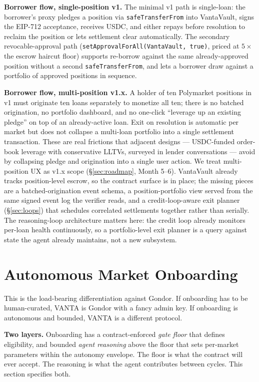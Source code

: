 \documentclass[11pt,letterpaper]{article}
\begin{document}
\textbf{Borrower flow, single-position v1.} The minimal v1 path is single-loan: the borrower's proxy pledges a position via \texttt{safeTransferFrom} into VantaVault, signs the EIP-712 acceptance, receives USDC, and either repays before resolution to reclaim the position or lets settlement clear automatically. The secondary revocable-approval path (\texttt{setApprovalForAll(VantaVault, true)}, priced at $5\times$ the escrow haircut floor) supports re-borrow against the same already-approved position without a second \texttt{safeTransferFrom}, and lets a borrower draw against a portfolio of approved positions in sequence.

\textbf{Borrower flow, multi-position v1.x.} A holder of ten Polymarket positions in v1 must originate ten loans separately to monetize all ten; there is no batched origination, no portfolio dashboard, and no one-click ``leverage up an existing pledge'' on top of an already-active loan. Exit on resolution is automatic per market but does not collapse a multi-loan portfolio into a single settlement transaction. These are real frictions that adjacent designs --- USDC-funded order-book leverage with conservative LLTVs, surveyed in lender conversations --- avoid by collapsing pledge and origination into a single user action. We treat multi-position UX as v1.x scope (\S\ref{sec:roadmap}, Month 5--6). VantaVault already tracks position-level escrow, so the contract surface is in place; the missing pieces are a batched-origination event schema, a position-portfolio view served from the same signed event log the verifier reads, and a credit-loop-aware exit planner (\S\ref{sec:loops}) that schedules correlated settlements together rather than serially. The reasoning-loop architecture matters here: the credit loop already monitors per-loan health continuously, so a portfolio-level exit planner is a query against state the agent already maintains, not a new subsystem.

\section{Autonomous Market Onboarding}
\label{sec:onboard}

This is the load-bearing differentiation against Gondor. If onboarding has to be human-curated, VANTA is Gondor with a fancy admin key. If onboarding is autonomous and bounded, VANTA is a different protocol.

\textbf{Two layers.} Onboarding has a contract-enforced \emph{gate floor} that defines eligibility, and bounded \emph{agent reasoning} above the floor that sets per-market parameters within the autonomy envelope. The floor is what the contract will ever accept. The reasoning is what the agent contributes between cycles. This section specifies both.
\end{document}
